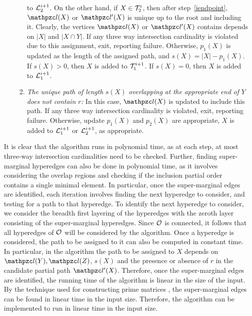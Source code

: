 \begin{enumerate}[I.]
\begin{enumerate}
    to ${\cal L}_2^{i+1}$.  On the other hand, if $X \in {\cal T}_2^i$, then
    after step~\ref{iendpoint}, $\cl(X)$ or $\cl'(X)$ is unique up to
    the root and including it. Clearly, the vertices $\cl(X)$ or
    $\cl'(X)$ contains depends on $|X|$ and $|X \cap Y|$.  If any
    three way intersection cardinality is violated due to this
    assignment, exit, reporting failure.  Otherwise,
    $p_1(X)$ is updated as the length of the assigned path, and $s(X)
    = |X|-p_1(X)$.  If $s(X) > 0$, then $X$ is added to ${\cal T}_1^{i+1}$.
    If $s(X)=0$, then $X$ is added to ${\cal L}_1^{i+1}$.
  \item {\em The unique path of length $s(X)$ overlapping at the
      appropriate end of $Y$ does not contain $r$:} In this case,
    $\cl(X)$ is updated to include this path.  If any three way
    intersection cardinality is violated, exit, reporting failure.
    Otherwise, update $p_1(X)$ and $p_2(X)$ are appropriate, $X$ is
    added to ${\cal L}_1^{i+1}$ or ${\cal L}_2^{i+1}$, as appropriate.
  \end{enumerate}
\end{enumerate}

 It
is clear that the algorithm runs in polynomial time, as at each step,
at most three-way intersection cardinalities need to be checked.
Further, finding super-marginal hyperedges can also be done in
polynomial time, as it involves considering the overlap regions and
checking if the inclusion partial order contains a single minimal
element.  In particular, once the super-marginal edges are identified,
each iteration involves finding the next hyperedge to consider, and
testing for a path to that hyperedge.  To identify the next hyperedge
to consider, we consider the breadth first layering of the hyperedges
with the zeroth layer consisting of the super-marginal hyperedges.
Since ${\cal O}$ is connected, it follows that all hyperedges of ${\cal O}$ will
be considered by the algorithm.  Once a hyperedge is considered, the
path to be assigned to it can also be computed in constant time.  In
particular, in the algorithm the path to be assigned to $X$ depends on
$\cl(Y), \cl(Z)$, $s(X)$ and the presence or absence of $r$ in the
candidate partial path $\cl'(X)$.  Therefore, once the super-marginal
edges are identified, the running time of the algorithm is linear in
the size of the input.  By the technique used for constructing prime
matrices \cite{wlh02}, the super-marginal edges can be found in linear
time in the input size.  Therefore, the algorithm can be implemented
to run in linear time in the input size.

